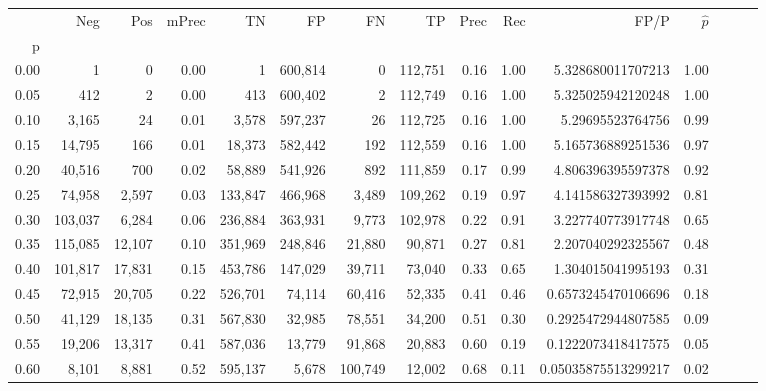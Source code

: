 \begin{tabular}{rrrrrrrrrrrrrrr}
\toprule
{} &      Neg &     Pos & mPrec &       TN &       FP &       FN &       TP &  Prec &   Rec &                    FP/P & $\hat{p}$ \\
p    &          &         &       &          &          &          &          &       &       &                         &           \\
\midrule
0.00 &        1 &       0 &  0.00 &        1 &  600,814 &        0 &  112,751 &  0.16 &  1.00 &       5.328680011707213 &      1.00 \\
0.05 &      412 &       2 &  0.00 &      413 &  600,402 &        2 &  112,749 &  0.16 &  1.00 &       5.325025942120248 &      1.00 \\
0.10 &    3,165 &      24 &  0.01 &    3,578 &  597,237 &       26 &  112,725 &  0.16 &  1.00 &        5.29695523764756 &      0.99 \\
0.15 &   14,795 &     166 &  0.01 &   18,373 &  582,442 &      192 &  112,559 &  0.16 &  1.00 &       5.165736889251536 &      0.97 \\
0.20 &   40,516 &     700 &  0.02 &   58,889 &  541,926 &      892 &  111,859 &  0.17 &  0.99 &       4.806396395597378 &      0.92 \\
0.25 &   74,958 &   2,597 &  0.03 &  133,847 &  466,968 &    3,489 &  109,262 &  0.19 &  0.97 &       4.141586327393992 &      0.81 \\
0.30 &  103,037 &   6,284 &  0.06 &  236,884 &  363,931 &    9,773 &  102,978 &  0.22 &  0.91 &       3.227740773917748 &      0.65 \\
0.35 &  115,085 &  12,107 &  0.10 &  351,969 &  248,846 &   21,880 &   90,871 &  0.27 &  0.81 &       2.207040292325567 &      0.48 \\
0.40 &  101,817 &  17,831 &  0.15 &  453,786 &  147,029 &   39,711 &   73,040 &  0.33 &  0.65 &       1.304015041995193 &      0.31 \\
0.45 &   72,915 &  20,705 &  0.22 &  526,701 &   74,114 &   60,416 &   52,335 &  0.41 &  0.46 &      0.6573245470106696 &      0.18 \\
0.50 &   41,129 &  18,135 &  0.31 &  567,830 &   32,985 &   78,551 &   34,200 &  0.51 &  0.30 &      0.2925472944807585 &      0.09 \\
0.55 &   19,206 &  13,317 &  0.41 &  587,036 &   13,779 &   91,868 &   20,883 &  0.60 &  0.19 &      0.1222073418417575 &      0.05 \\
0.60 &    8,101 &   8,881 &  0.52 &  595,137 &    5,678 &  100,749 &   12,002 &  0.68 &  0.11 &     0.05035875513299217 &      0.02 \\

\end{tabular}

